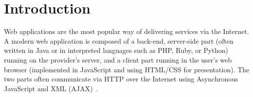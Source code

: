






\section{Introduction}

Web applications are the most popular way of delivering services via the
Internet. A modern web application is composed of a back-end, server-side part
(often written in Java or in interpreted languages such as PHP, Ruby, or
Python) running on the provider's server, and a client part running in the
user's web browser (implemented in JavaScript and using HTML/CSS for
presentation). The two parts often communicate via HTTP over the Internet using
Asynchronous JavaScript and XML (AJAX)~\cite{garrett05:ajax}.

